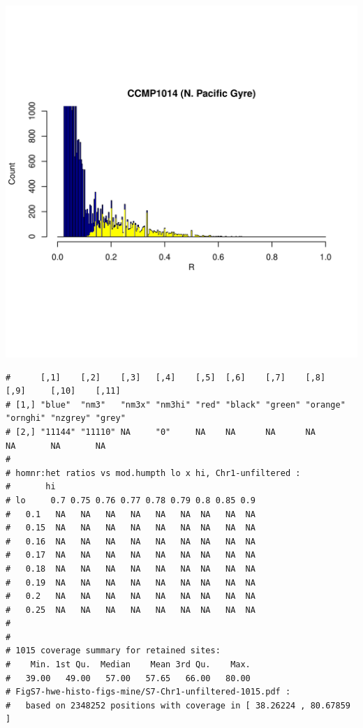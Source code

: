 \documentclass{article}\usepackage[]{graphicx}\usepackage[]{color}
\makeatletter
\def\maxwidth{ %
  \ifdim\Gin@nat@width>\linewidth
    \linewidth
  \else
    \Gin@nat@width
  \fi
}
\newenvironment{kframe}{%
 \def\at@end@of@kframe{}%
 \ifinner\ifhmode%
  \def\at@end@of@kframe{\end{minipage}}%
  \begin{minipage}{\columnwidth}%
 \fi\fi%
 \def\FrameCommand##1{\hskip\@totalleftmargin \hskip-\fboxsep
 \colorbox{shadecolor}{##1}\hskip-\fboxsep
     \hskip-\linewidth \hskip-\@totalleftmargin \hskip\columnwidth}%
 \MakeFramed {\advance\hsize-\width
   \@totalleftmargin\z@ \linewidth\hsize
   \@setminipage}}%
 {\par\unskip\endMakeFramed%
 \at@end@of@kframe}
\newenvironment{knitrout}{}{} %
\makeatother
\begin{document}
\begin{knitrout}
\includegraphics[width=\maxwidth]{FigS7-hwe-histo-figs-knitr/unnamed-chunk-10-21} 
\begin{kframe}\begin{verbatim}
#      [,1]    [,2]    [,3]   [,4]    [,5]  [,6]    [,7]    [,8]     [,9]     [,10]    [,11] 
# [1,] "blue"  "nm3"   "nm3x" "nm3hi" "red" "black" "green" "orange" "ornghi" "nzgrey" "grey"
# [2,] "11144" "11110" NA     "0"     NA    NA      NA      NA       NA       NA       NA
# 
# homnr:het ratios vs mod.humpth lo x hi, Chr1-unfiltered :
#       hi
# lo     0.7 0.75 0.76 0.77 0.78 0.79 0.8 0.85 0.9
#   0.1   NA   NA   NA   NA   NA   NA  NA   NA  NA
#   0.15  NA   NA   NA   NA   NA   NA  NA   NA  NA
#   0.16  NA   NA   NA   NA   NA   NA  NA   NA  NA
#   0.17  NA   NA   NA   NA   NA   NA  NA   NA  NA
#   0.18  NA   NA   NA   NA   NA   NA  NA   NA  NA
#   0.19  NA   NA   NA   NA   NA   NA  NA   NA  NA
#   0.2   NA   NA   NA   NA   NA   NA  NA   NA  NA
#   0.25  NA   NA   NA   NA   NA   NA  NA   NA  NA
# 
# 
# 1015 coverage summary for retained sites:
#    Min. 1st Qu.  Median    Mean 3rd Qu.    Max. 
#   39.00   49.00   57.00   57.65   66.00   80.00 
# FigS7-hwe-histo-figs-mine/S7-Chr1-unfiltered-1015.pdf :
#   based on 2348252 positions with coverage in [ 38.26224 , 80.67859 ]
\end{verbatim}
\end{kframe}

\end{knitrout}
\end{document}
